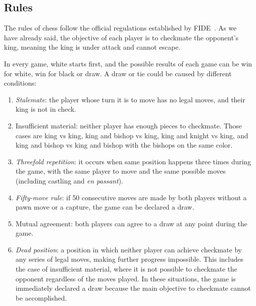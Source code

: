 \subsection*{Rules}\label{sec:rules}

The rules of chess follow the official regulations established by FIDE~\cite{LawsOfChess}. As we have already said, the objective of each player is to checkmate the opponent's king, meaning the king is under attack and cannot escape.

\vspace{1em}

\noindent In every game, white starts first, and the possible results of each game can be win for white, win for black or draw. A draw or tie could be caused by different conditions:

\begin{enumerate}
    \item \textit{Stalemate}: the player whose turn it is to move has no legal moves, and their king is not in check.
    \item Insufficient material: neither player has enough pieces to checkmate. Those cases are king vs king, king and bishop vs king, king and knight vs king, and king and bishop vs king and bishop with the bishops on the same color.
    \item \textit{Threefold repetition}: it occurs when same position happens three times during the game, with the same player to move and the same possible moves (including castling and \textit{en passant}).
    \item \textit{Fifty-move rule}: if 50 consecutive moves are made by both players without a pawn move or a capture, the game can be declared a draw.
    \item Mutual agreement: both players can agree to a draw at any point during the game.
    \item \textit{Dead position}: a position in which neither player can achieve checkmate by any series of legal moves, making further progress impossible. This includes the case of insufficient material, where it is not possible to checkmate the opponent regardless of the moves played. In these situations, the game is immediately declared a draw because the main objective to checkmate cannot be accomplished.
\end{enumerate}

